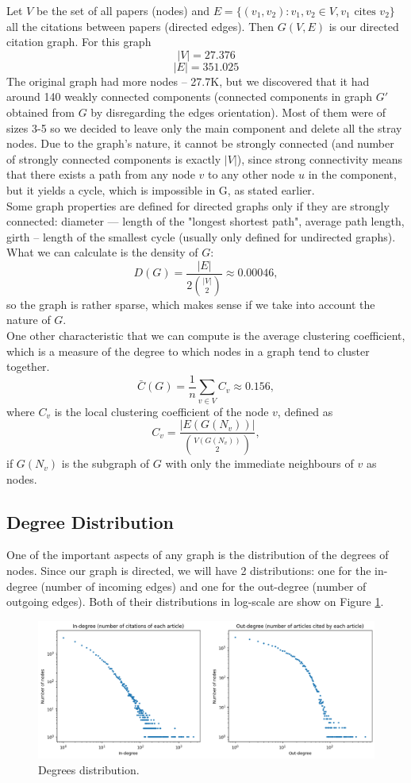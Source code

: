\documentclass{article}
\newcommand\tab[1][1cm]{\hspace*{#1}}
\begin{document}
\tab Let $V$ be the set of all papers (nodes) and $E = \{(v_1, v_2): v_1, v_2 \in V, v_1 \text{ cites } v_2 \}$ all the citations between papers (directed edges). Then $G(V, E)$ is our directed citation graph.
For this graph $$|V| = 27.376$$ $$|E| = 351.025$$
\tab The original graph had more nodes -- 27.7K, but we discovered that it had around 140 weakly connected components (connected components in graph $G'$ obtained from $G$ by disregarding the edges orientation). Most of them were of sizes 3-5 so we decided to leave only the main component and delete all the stray nodes. Due to the graph's nature, it cannot be strongly connected (and number of strongly connected components is exactly $|V|$), since strong connectivity means that there exists a path from any node $v$ to any other node $u$ in the component, but it yields a cycle, which is impossible in G, as stated earlier. \\
\tab Some graph properties are defined for directed graphs only if they are strongly connected: diameter --- length of the "longest shortest path", average path length, girth -- length of the smallest cycle (usually only defined for undirected graphs). What we can calculate is the density of $G$:
$$D(G) = \frac{|E|}{2\binom{|V|}{2}} \approx 0.00046,$$
so the graph is rather sparse, which makes sense if we take into account the nature of $G$.\\
\tab One other characteristic that we can compute is the average clustering coefficient, which is a measure of the degree to which nodes in a graph tend to cluster together. 
$$\bar{C}(G) = \frac{1}{n}\sum_{v \in V}C_v \approx 0.156,$$
where $C_v$ is the local clustering coefficient of the node $v$, defined as $$C_v = \frac{|E(G(N_v))|}{\binom{V(G(N_v))}{2}},$$
if $G(N_v)$ is the subgraph of $G$ with only the immediate neighbours of $v$  as nodes.

\subsection{Degree Distribution}
\tab One of the important aspects of any graph is the distribution of the degrees of nodes. Since our graph is directed, we will have 2 distributions: one for the in-degree (number of incoming edges) and one for the out-degree (number of outgoing edges). Both of their distributions in log-scale are show on Figure \ref{plot:degree}.

\begin{figure}[h]
\centering
\includegraphics[width=1\linewidth]{degree_distribution.png}
\caption{Degrees distribution.}
\label{plot:degree}
\end{figure}
\end{document}
